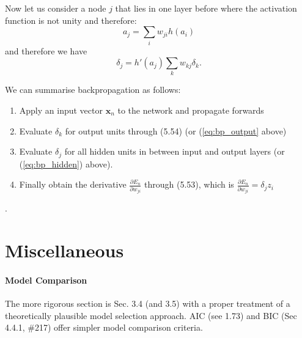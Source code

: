 \documentclass[a4paper]{article}
\newcommand{\mb}{\mathbf}
\begin{document}
Now let us consider a node $j$ that lies in one layer before where the activation function is not unity and therefore:
\begin{equation}
a_j=\sum\limits_i w_{ji} h(a_{i})
\end{equation}
%
%
and therefore we have 
\begin{equation}
\delta_j=h'(a_j)\sum_{k}w_{kj}\delta_k.
\label{eq:bp_hidden}
\end{equation}

We can summarise backpropagation as follows:
\begin{enumerate}
\setlength{\parindent}{0mm}
\item Apply an input vector $\mb{x}_n$ to the network and propagate forwards
\item Evaluate $\delta_k$ for output units through (5.54) (or (\ref{eq:bp_output} above)
\item Evaluate $\delta_j$ for all hidden units in between input and output layers (or (\ref{eq:bp_hidden}) above).
\item Finally obtain the derivative $\frac{\partial E_n}{\partial w_{ji}}$ through (5.53), which is $\frac{\partial E_n}{\partial w_{ji}}=\delta_j z_i$
\end{enumerate}
.















\clearpage
\newpage



\section*{Miscellaneous}
\paragraph*{Model Comparison} The more rigorous section is Sec. 3.4 (and 3.5) with a proper treatment of a theoretically plausible model selection approach. AIC (see 1.73) and BIC (Sec 4.4.1, \#217) offer simpler model comparison criteria.







\end{document}
